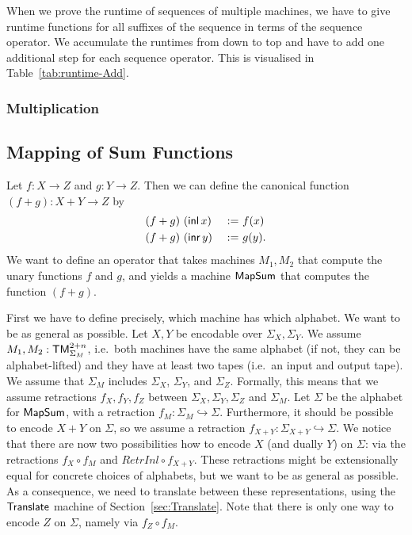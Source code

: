 When we prove the runtime of sequences of multiple machines, we have to give runtime functions for all suffixes of the sequence in terms of the
sequence operator.  We accumulate the runtimes from down to top and have to add one additional step for each sequence operator.  This is visualised in
Table~\ref{tab:runtime-Add}.


\subsubsection{Multiplication}
\label{sec:Mult}



\subsection{Mapping of Sum Functions}
\label{sec:SumTM}

Let $f : X \to Z$ and $g : Y \to Z$.  Then we can define the canonical function $(f+g) : X+Y \to Z$ by
\begin{alignat*}{2}
  (f+g)&~(\operatorname{\mathsf{inl}} x)&~:=~& f(x) \\
  (f+g)&~(\operatorname{\mathsf{inr}} y)&~:=~& g(y).
\end{alignat*}
We want to define an operator that takes machines $M_1, M_2$ that compute the unary functions $f$ and $g$, and yields a machine $\mathsf{MapSum}$ that
computes the function $(f+g)$.

First we have to define precisely, which machine has which alphabet.  We want to be as general as possible.  Let $X, Y$ be encodable over
$\Sigma_X, \Sigma_Y$.  We assume $M_1, M_2 : \mathsf{TM}_{\Sigma_M}^{2+n}$, i.e.\ both machines have the same alphabet (if not, they can be alphabet-lifted)
and they have at least two tapes (i.e.\ an input and output tape).  We assume that $\Sigma_M$ includes $\Sigma_X$, $\Sigma_Y$, and $\Sigma_Z$.
Formally, this means that we assume retractions $f_X,f_Y,f_Z$ between $\Sigma_X, \Sigma_Y, \Sigma_Z$ and $\Sigma_M$.  Let $\Sigma$ be the alphabet for
$\mathsf{MapSum}$, with a retraction $f_M : \Sigma_M \hookrightarrow \Sigma$.  Furthermore, it should be possible to encode $X+Y$ on $\Sigma$, so we
assume a retraction $f_{X+Y} : \Sigma_{X+Y} \hookrightarrow \Sigma$.  We notice that there are now two possibilities how to encode $X$ (and dually
$Y$) on $\Sigma$: via the retractions $f_X \circ f_M$ and $RetrInl \circ f_{X+Y}$.  These retractions might be extensionally equal for concrete
choices of alphabets, but we want to be as general as possible.  As a consequence, we need to translate between these representations, using the
$\mathsf{Translate}$ machine of Section~\ref{sec:Translate}.  Note that there is only one way to encode $Z$ on $\Sigma$, namely via $f_Z \circ f_M$.

